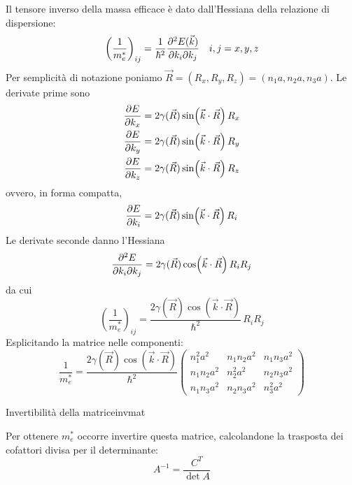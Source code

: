 \begin{solution}
    Il tensore inverso della massa efficace è dato dall'Hessiana della relazione di dispersione:
    \begin{equation}
        \left( \frac{1}{m_e^*} \right)_{ij} = \frac{1}{\hbar^2} \pdv{E(\vec{k})}{k_i}{k_j} \quad i, j = x, y, z
    \end{equation}
    Per semplicità di notazione poniamo \( \vec{R} = (R_x, R_y, R_z) = (n_1 a, n_2 a, n_3 a) \). Le derivate prime sono
    \begin{align}
        \pdv{E}{k_x} &= 2 \gamma(\vec{R}) \sin(\vec{k} \cdot \vec{R}) \, R_x \\
        \pdv{E}{k_y} &= 2 \gamma(\vec{R}) \sin(\vec{k} \cdot \vec{R}) \, R_y \\
        \pdv{E}{k_z} &= 2 \gamma(\vec{R}) \sin(\vec{k} \cdot \vec{R}) \, R_z
    \end{align}
    ovvero, in forma compatta,
    \begin{equation}
        \pdv{E}{k_i} = 2 \gamma(\vec{R}) \sin(\vec{k} \cdot \vec{R}) \, R_i
    \end{equation}
    Le derivate seconde danno l'Hessiana
    \begin{equation}
        \pdv{E}{k_i}{k_j} = 2 \gamma(\vec{R}) \cos(\vec{k} \cdot \vec{R}) \, R_i R_j
    \end{equation}
    da cui
    \begin{equation}
        \left( \frac{1}{m_e^*} \right)_{ij} = \frac{2 \gamma(\vec{R}) \cos(\vec{k} \cdot \vec{R})}{\hbar^2} \, R_i R_j
    \end{equation}
    Esplicitando la matrice nelle componenti:
    \begin{equation}
        \frac{1}{m_e^*} = \frac{2 \gamma(\vec{R}) \cos(\vec{k} \cdot \vec{R})}{\hbar^2}
        \begin{pmatrix}
            n_1^2 a^2 & n_1 n_2 a^2 & n_1 n_3 a^2 \\
            n_1 n_2 a^2 & n_2^2 a^2 & n_2 n_3 a^2 \\
            n_1 n_3 a^2 & n_2 n_3 a^2 & n_3^2 a^2
        \end{pmatrix}
    \end{equation}

\begin{note}{Invertibilità della matrice}{invmat}
    
    Per ottenere \( m_e^* \) occorre invertire questa matrice, calcolandone la trasposta dei cofattori divisa per il determinante:
    \begin{equation}
        A^{-1} = \frac{C^T}{\det A}
    \end{equation}



\end{note}
\end{solution}
